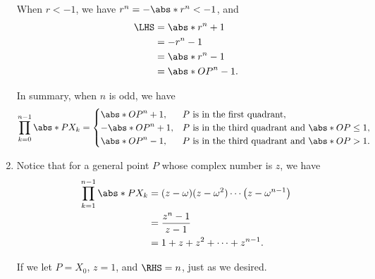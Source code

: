 \begin{enumerate}
          When \(r < -1\), we have \(r^n = -\abs*{r}^n < -1\), and
          \begin{align*}
              \LHS & = \abs*{r^n + 1}   \\
                   & = -r^n - 1         \\
                   & = \abs*{r}^n - 1   \\
                   & = \abs*{OP}^n - 1.
          \end{align*}

          In summary, when \(n\) is odd, we have
          \[
              \prod_{k = 0}^{n - 1} \abs*{P X_k} =
              \begin{cases}
                  \abs*{OP}^n + 1,  & P \text{ is in the first quadrant},                       \\
                  -\abs*{OP}^n + 1, & P \text{ is in the third quadrant and } \abs*{OP} \leq 1, \\
                  \abs*{OP}^n - 1,  & P \text{ is in the third quadrant and } \abs*{OP} > 1.
              \end{cases}
          \]

    \item Notice that for a general point \(P\) whose complex number is \(z\), we have
          \begin{align*}
              \prod_{k = 1}^{n - 1} \abs*{P X_k} & = (z - \omega) (z - \omega^2) \cdots \left(z - \omega^{n - 1}\right) \\
                                                 & = \frac{z^n - 1}{z - 1}                                              \\
                                                 & = 1 + z + z^2 + \cdots + z^{n - 1}.
          \end{align*}

          If we let \(P = X_0\), \(z = 1\), and \(\RHS = n\), just as we desired.
\end{enumerate}